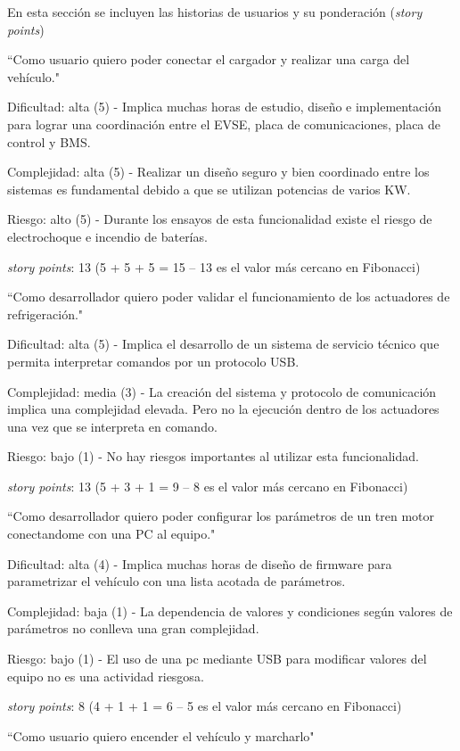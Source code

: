 \documentclass[
11pt, %
codirector, %
]{charter}
\begin{document}
En esta sección se incluyen las historias de usuarios y su ponderación (\textit{story points})

``Como usuario quiero poder conectar el cargador y realizar una carga del vehículo."

Dificultad: alta (5) - Implica muchas horas de estudio, diseño e implementación para lograr una coordinación entre el EVSE, placa de comunicaciones, placa de control y BMS.

Complejidad: alta (5) - Realizar un diseño seguro y bien coordinado entre los sistemas es fundamental debido a que se utilizan potencias de varios KW.

Riesgo: alto (5) - Durante los ensayos de esta funcionalidad existe el riesgo de electrochoque e incendio de baterías.

\textit{story points}: 13
(5 + 5 + 5 = 15 -- 13 es el valor más cercano en Fibonacci)

``Como desarrollador quiero poder validar el funcionamiento de los actuadores de refrigeración."

Dificultad: alta (5) - Implica el desarrollo de un sistema de servicio técnico que permita interpretar comandos por un protocolo USB.

Complejidad: media (3) - La creación del sistema y protocolo de comunicación implica una complejidad elevada. Pero no la ejecución dentro de los actuadores una vez que se interpreta en comando.

Riesgo: bajo (1) - No hay riesgos importantes al utilizar esta funcionalidad.

\textit{story points}: 13
(5 + 3 + 1 = 9 -- 8 es el valor más cercano en Fibonacci)

``Como desarrollador quiero poder configurar los parámetros de un tren motor conectandome con una PC al equipo."

Dificultad: alta (4) - Implica muchas horas de diseño de firmware para parametrizar el vehículo con una lista acotada de parámetros.

Complejidad: baja (1) - La dependencia de valores y condiciones según valores de parámetros no conlleva una gran complejidad.

Riesgo: bajo (1) - El uso de una pc mediante USB para modificar valores del equipo no es una actividad riesgosa.

\textit{story points}: 8
(4 + 1 + 1 = 6 -- 5 es el valor más cercano en Fibonacci)

``Como usuario quiero encender el vehículo y marcharlo"
\end{document}
